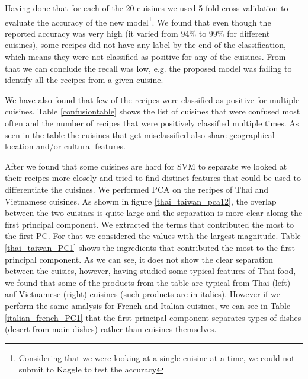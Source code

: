 \documentclass[prodmode,acmtap]{acmlarge}
\begin{document}
Having done that for each of the 20 cuisines we used 5-fold cross validation to evaluate the accuracy of the new model\footnote{Considering that we were looking at a single cuisine at a time, we could not submit to Kaggle to test the accuracy}. We found that even though the reported accuracy was very high (it varied from 94\% to 99\% for different cuisines), some recipes did not have any label by the end of the classification, which means they were not classified as positive for any of the cuisines. From that we can conclude the recall was low, e.g. the proposed model was failing to identify all the recipes from a given cuisine. 

We have also found that few of the recipes were classified as positive for multiple cuisines. Table \ref{confusiontable} shows the list of cuisines that were confused most often and the number of recipes that were positively classified multiple times. As seen in the table the cuisines that get misclassified also share geographical location and/or cultural features. 



After we found that some cuisines are hard for SVM to separate we looked at their recipes more closely and tried to find distinct features that could be used to differentiate the cuisines. We performed PCA on the recipes of Thai and Vietnamese cuisines. As showm in figure \ref{thai_taiwan_pca12}, the overlap between the two cuisines is quite large and the separation is more clear alomg the first principal component. We extracted the terms that contributed the most to the first PC. For that we considered the values with the largest magnitude. Table \ref{thai_taiwan_PC1} shows the ingredients that contributed the most to the first principal component. As we can see, it does not show the clear separation between the cuisies, however, having studied some typical features of Thai food, we found that some of the products from the table are typical from Thai (left) anf Vietnamese (right) cuisines (such products are in italics). However if we perform the same amalysis for French and Italian cuisines, we can see in Table \ref{italian_french_PC1} that the first principal component separates types of dishes (desert from main dishes) rather than cuisines themselves. 







\end{document}
